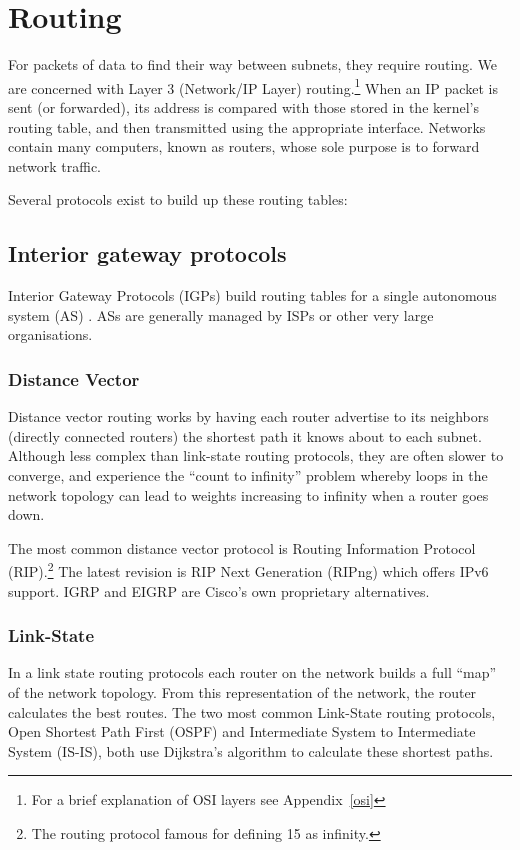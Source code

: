 \section{Routing}
For packets of data to find their way between subnets, they require routing.
We are concerned with Layer 3 (Network/IP Layer) routing.\footnote{For a brief
explanation of OSI layers see Appendix~\ref{osi}} When an IP packet is sent
(or forwarded), its address is compared with those stored in the kernel's
routing table, and then transmitted using the appropriate interface. Networks
contain many computers, known as routers, whose sole purpose is to forward
network traffic.

Several protocols exist to build up these routing tables:

\subsection{Interior gateway protocols}
Interior Gateway Protocols (IGPs)  build routing tables for a single autonomous system (AS)
. ASs are generally managed by ISPs or
other very large organisations.  

\subsubsection{Distance Vector}
Distance vector routing works by having each router advertise to its neighbors
(directly connected routers) the shortest path it knows about to each subnet.
Although less complex than link-state routing protocols, they are often slower
to converge, and experience the ``count to infinity'' problem whereby loops in
the network topology can lead to weights increasing to infinity when a router
goes down. 

The most common distance vector protocol is Routing Information Protocol
(RIP).\footnote{The routing
protocol famous for defining 15 as infinity.} The latest revision is RIP Next
Generation (RIPng) which offers IPv6 support. IGRP and EIGRP are Cisco's own
proprietary alternatives.

\subsubsection{Link-State}
In a link state routing protocols each router on the network builds a full
``map'' of the network topology. From this representation of the network, the
router calculates the best routes. The two most common Link-State routing
protocols, Open Shortest Path First (OSPF)  and Intermediate System to Intermediate System (IS-IS),
 both use
Dijkstra's algorithm to calculate these shortest paths. 


